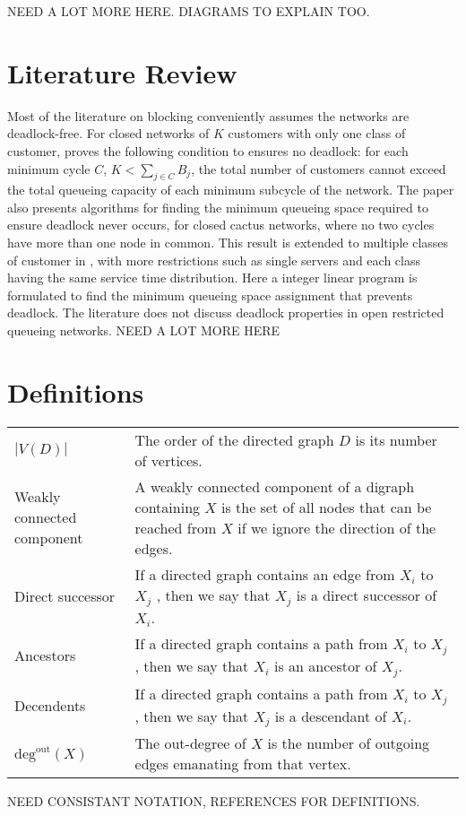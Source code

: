 \documentclass{article}
\begin{document}
NEED A LOT MORE HERE. DIAGRAMS TO EXPLAIN TOO.



\section{Literature Review}

Most of the literature on blocking conveniently assumes the networks are deadlock-free.
For closed networks of $K$ customers with only one class of customer, \cite{kunduakyildiz89} proves the following condition to ensures no deadlock: for each minimum cycle $C$, $K < \sum_{j\in C} B_j$, the total number of customers cannot exceed the total queueing capacity of each minimum subcycle of the network.
The paper also presents algorithms for finding the minimum queueing space required to ensure deadlock never occurs, for closed cactus networks, where no two cycles have more than one node in common.
This result is extended to multiple classes of customer in \cite{liebeherrakyildiz95}, with more restrictions such as single servers and each class having the same service time distribution.
Here a integer linear program is formulated to find the minimum queueing space assignment that prevents deadlock.
The literature does not discuss deadlock properties in open restricted queueing networks.\newline
NEED A LOT MORE HERE



\section{Definitions}

\begin{tabular}{ p{5cm} p{10cm} }
  $\left| V(D) \right|$ & The order of the directed graph $D$ is its number of vertices. \\
  Weakly connected component & A weakly connected component of a digraph containing $X$ is the set of all nodes that can be reached from $X$ if we ignore the direction of the edges. \\
  Direct successor & If a directed graph contains an edge from $X_i$ to $X_j$ , then we say that $X_j$ is a direct successor of $X_i$. \\
  Ancestors & If a directed graph contains a path from $X_i$ to $X_j$ , then we say that $X_i$ is an ancestor of $X_j$. \\
  Decendents & If a directed graph contains a path from $X_i$ to $X_j$ , then we say that $X_j$ is a descendant of $X_i$. \\
  $\text{deg}^{\text{out}}(X)$ & The out-degree of $X$ is the number of outgoing edges emanating from that vertex. \\
\end{tabular}
\newline
NEED CONSISTANT NOTATION, REFERENCES FOR DEFINITIONS.
\end{document}

